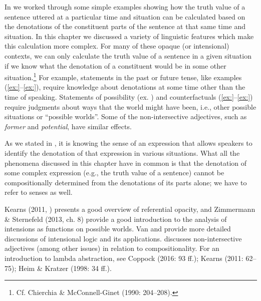In  we worked through some simple examples showing how the truth value of a sentence uttered at a particular time and situation can be calculated based on the denotations of the constituent parts of the sentence at that same time and situation. In this chapter we discussed a variety of linguistic features which make this calculation more complex. For many of these opaque (or intensional) contexts, we can only calculate the truth value of a sentence in a given situation if we know what the denotation of a constituent would be in some other situation.\footnote{Cf. Chierchia \& McConnell-Ginet (1990: 204–208).} For example, statements in the past or future tense, like examples (\ref{ex:}--\ref{ex:}), require knowledge about denotations at some time other than the time of speaking. Statements of possibility (ex. ) and counterfactuals (\ref{ex:}--\ref{ex:}) require judgments about ways that the world might have been, i.e., other possible situations or “possible worlds”. Some of the non-intersective adjectives, such as \textit{former} and \textit{potential}, have similar effects.



As we stated in , it is knowing the sense of an expression that allows speakers to identify the denotation of that expression in various situations. What all the phenomena discussed in this chapter have in common is that the denotation of some complex expression (e.g., the truth value of a sentence) cannot be compositionally determined from the denotations of its parts alone; we have to refer to senses as well.



\furtherreading



Kearns (2011, ) presents a good overview of referential opacity, and Zimmermann \& Sternefeld (2013, ch. 8) provide a good introduction to the analysis of intensions as functions on possible worlds. Van \citet{Benthem1988} and \citet{Gamut1991b} provide more detailed discussions of intensional logic and its applications. \citet{Partee1995} discusses non-intersective adjectives (among other issues) in relation to compositionality. For an introduction to lambda abstraction, see Coppock (2016: 93 ff.); Kearns (2011: 62–75); Heim \& Kratzer (1998: 34 ff.).